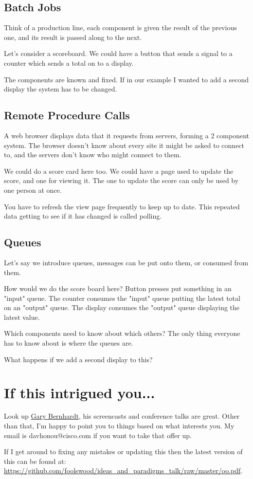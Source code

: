 \documentclass{article}
\begin{document}
\subsection{Batch Jobs}
Think of a production line, each component is given the result of the previous
one, and its result is passed along to the next.

Let's consider a scoreboard.
We could have a button that sends a signal to a counter which sends a total on
to a display.

The components are known and fixed.
If in our example I wanted to add a second display the system has to be
changed.

\subsection{Remote Procedure Calls}
A web browser displays data that it requests from servers, forming a 2
component system. The browser doesn't know about every site it might be asked
to connect to, and the servers don't know who might connect to them.

We could do a score card here too.
We could have a page used to update the score, and one for viewing it.
The one to update the score can only be used by one person at once.

You have to refresh the view page frequently to keep up to date.
This repeated data getting to see if it has changed is called polling.

\subsection{Queues}
Let's say we introduce queues, messages can be put onto them, or consumed from them.

How would we do the score board here?
Button presses put something in an "input" queue.
The counter consumes the "input" queue putting the latest total on an "output" queue.
The display consumes the "output" queue displaying the latest value.

Which components need to know about which others?
The only thing everyone has to know about is where the queues are.

What happens if we add a second display to this?

\section{If this intrigued you...}
Look up \href{www.destroyallsoftware.com}{Gary Bernhardt}, his screencasts and
conference talks are great.
Other than that, I'm happy to point you to things based on what interests you.
My email is davhonou@cisco.com if you want to take that offer up.

If I get around to fixing any mistakes or updating this then the latest version
of this can be found at:
\url{https://github.com/foolswood/ideas\_and\_paradigms\_talk/raw/master/oo.pdf}.
\end{document}
